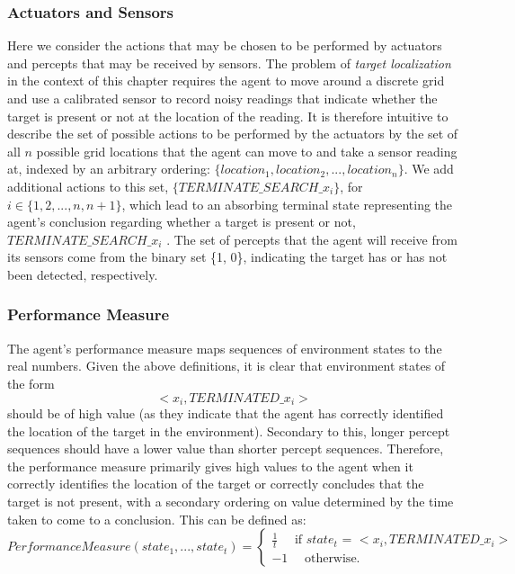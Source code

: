 \subsubsection{Actuators and Sensors}
Here we consider the actions that may be chosen to be performed by actuators and percepts that may be received by sensors. The problem of \textit{target localization} in the context of this chapter requires the agent to move around a discrete grid and use a calibrated sensor to record noisy readings that indicate whether the target is present or not at the location of the reading. It is therefore intuitive to describe the set of possible actions to be performed by the actuators by the set of all $n$ possible grid locations that the agent can move to and take a sensor reading at, indexed by an arbitrary ordering: $\{location_1, location_2, ..., location_n\}$. We add additional actions to this set, $\{TERMINATE\_SEARCH\_x_{i}\}$, for $i \in \{1, 2, ..., n, n+1\}$, which lead to an absorbing terminal state representing the agent's conclusion regarding whether a target is present or not, $TERMINATE\_SEARCH\_x_{i}$ . The set of percepts that the agent will receive from its sensors come from the binary set \{1, 0\}, indicating the target has or has not been detected, respectively.



\subsubsection{Performance Measure}
The agent's performance measure maps sequences of environment states to the real numbers. Given the above definitions, it is clear that environment states of the form
\[ <x_i, TERMINATED\_x_i> \]
should be of high value (as they indicate that the agent has correctly identified the location of the target in the environment). Secondary to this, longer percept sequences should have a lower value than shorter percept sequences. Therefore, the performance measure primarily gives high values to the agent when it correctly identifies the location of the target or correctly concludes that the target is not present, with a secondary ordering on value determined by the time taken to come to a conclusion. This can be defined as:
\[
Performance Measure(state_1,..., state_t) = 
\begin{cases}
\frac{1}{t} \quad \text{ if } state_t \text{ = } <x_i, TERMINATED\_x_i>
\\
-1 \quad \text { otherwise. }
\end{cases}
\]

